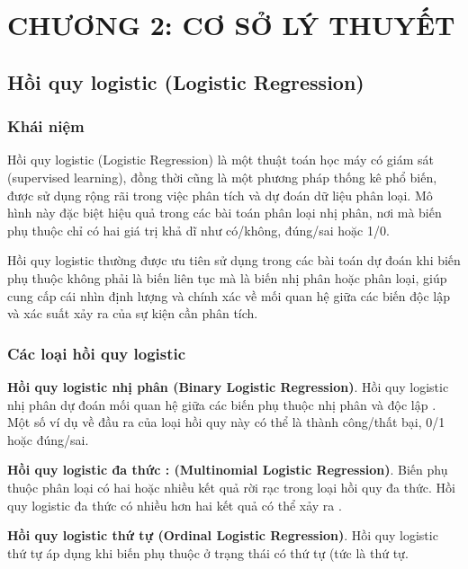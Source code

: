 \documentclass[
]{article}
\begin{document}
\section*{CHƯƠNG 2: CƠ SỞ LÝ THUYẾT}
\setcounter{section}{2}
\setcounter{subsection}{0}

\subsection{Hồi quy logistic (Logistic
Regression)}\label{hux1ed3i-quy-logistic-logistic-regression}

\subsubsection{Khái niệm}\label{khuxe1i-niux1ec7m}

Hồi quy logistic (Logistic Regression) là một thuật toán học máy có giám
sát (supervised learning), đồng thời cũng là một phương pháp thống kê
phổ biến, được sử dụng rộng rãi trong việc phân tích và dự đoán dữ liệu
phân loại. Mô hình này đặc biệt hiệu quả trong các bài toán phân loại
nhị phân, nơi mà biến phụ thuộc chỉ có hai giá trị khả dĩ như có/không,
đúng/sai hoặc 1/0.

Hồi quy logistic thường được ưu tiên sử dụng trong các bài toán dự đoán
khi biến phụ thuộc không phải là biến liên tục mà là biến nhị phân hoặc
phân loại, giúp cung cấp cái nhìn định lượng và chính xác về mối quan hệ
giữa các biến độc lập và xác suất xảy ra của sự kiện cần phân tích.

\subsubsection{Các loại hồi quy
logistic}\label{cuxe1c-loux1ea1i-hux1ed3i-quy-logistic}

\textbf{Hồi quy logistic nhị phân (Binary Logistic Regression)}. Hồi quy
logistic nhị phân dự đoán mối quan hệ giữa các biến phụ thuộc nhị phân
và độc lập . Một số ví dụ về đầu ra của loại hồi quy này có thể là thành
công/thất bại, 0/1 hoặc đúng/sai.

\textbf{Hồi quy logistic đa thức : (Multinomial Logistic Regression)}.
Biến phụ thuộc phân loại có hai hoặc nhiều kết quả rời rạc trong loại
hồi quy đa thức. Hồi quy logistic đa thức có nhiều hơn hai kết quả có
thể xảy ra .

\textbf{Hồi quy logistic thứ tự (Ordinal Logistic Regression)}. Hồi quy
logistic thứ tự áp dụng khi biến phụ thuộc ở trạng thái có thứ tự (tức
là thứ tự.
\end{document}
